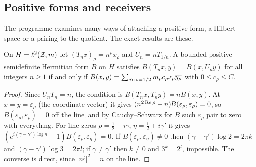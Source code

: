 \subsection{Positive forms and receivers}\label{ssec:receivers}

The programme examines many ways of attaching a positive form, a Hilbert space or a pairing to the quotient. The exact results are these.

\begin{lemma}\label{lem:PTQ}
On $H=\ell^2(\mathcal{Z},m)$ let $(T_nx)_\rho=n^\rho x_\rho$ and $U_n=nT_{1/n}$. A bounded positive semidefinite Hermitian form $B$ on $H$ satisfies $B(T_nx,y)=B(x,U_ny)$ for all integers $n\ge1$ if and only if $B(x,y)=\sum_{\operatorname{Re}\rho=1/2}m_\rho c_\rho x_\rho\overline{y_\rho}$ with $0\le c_\rho\le C$.
\end{lemma}

\begin{proof}
Since $U_nT_n=n$, the condition is $B(T_nx,T_ny)=nB(x,y)$. At $x=y=\varepsilon_\rho$ (the coordinate vector) it gives $(n^{2\operatorname{Re}\rho}-n)B(\varepsilon_\rho,\varepsilon_\rho)=0$, so $B(\varepsilon_\rho,\varepsilon_\rho)=0$ off the line, and by Cauchy--Schwarz for $B$ such $\varepsilon_\rho$ pair to zero with everything.
For line zeros $\rho=\tfrac12+i\gamma$, $\eta=\tfrac12+i\gamma'$ it gives $(e^{i(\gamma-\gamma')\log n}-1)B(\varepsilon_\rho,\varepsilon_\eta)=0$. If $B(\varepsilon_\rho,\varepsilon_\eta)\ne0$ then $(\gamma-\gamma')\log2=2\pi k$ and $(\gamma-\gamma')\log3=2\pi l$; if $\gamma\ne\gamma'$ then $k\ne0$ and $3^k=2^l$, impossible. The converse is direct, since $|n^\rho|^2=n$ on the line.
\end{proof}

